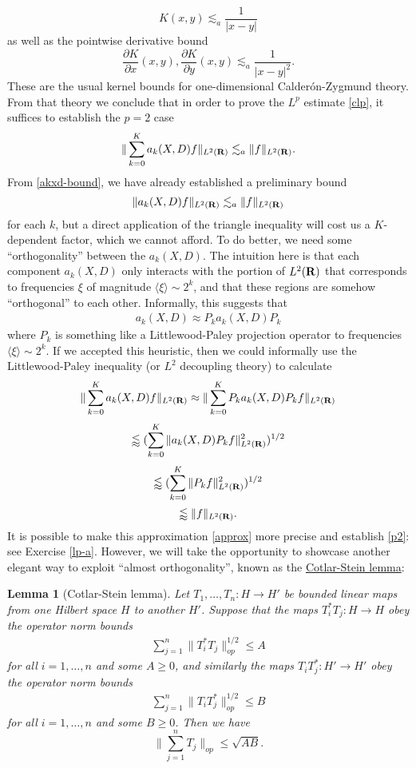 \documentclass[11pt]{article}
\newtheorem{lemma}[theorem]{Lemma}
\theoremstyle{definition}
\theoremstyle{remark}
\begin{document}
\[\displaystyle  K(x,y) \lesssim_a \frac{1}{|x-y|}\]
 as well as the pointwise derivative bound 
\[\displaystyle  \frac{\partial K}{\partial x}(x,y), \frac{\partial K}{\partial y}(x,y) \lesssim_{a} \frac{1}{|x-y|^2}.\]
 These are the usual kernel bounds for one-dimensional Calderón-Zygmund theory. From that theory we conclude that in order to prove the \({L^p}\) estimate \eqref{clp}, it suffices to establish the \({p=2}\) case 
\begin{align}\label{p2}
  \| \sum_{k=0}^K a_k(X,D) f\|_{L^2({\bf R})} \lesssim_{a} \|f\|_{L^2({\bf R})}. 
\end{align}
 From \eqref{akxd-bound}, we have already established a preliminary bound 
\[\displaystyle  \| a_k(X,D) f\|_{L^2({\bf R})} \lesssim_{a} \|f\|_{L^2({\bf R})}\]
 for each \({k}\), but a direct application of the triangle inequality will cost us a \({K}\)-dependent factor, which we cannot afford. To do better, we need some “orthogonality” between the \({a_k(X,D)}\). The intuition here is that each component \({a_k(X,D)}\) only interacts with the portion of \({L^2({\bf R})}\) that corresponds to frequencies \({\xi}\) of magnitude \({\langle \xi \rangle \sim 2^k}\), and that these regions are somehow “orthogonal” to each other. Informally, this suggests that 
\begin{align}\label{approx}
  a_k(X,D) \approx P_k a_k(X,D) P_k 
\end{align}
 where \({P_k}\) is something like a Littlewood-Paley projection operator to frequencies \({\langle \xi \rangle \sim 2^k}\). If we accepted this heuristic, then we could informally use the Littlewood-Paley inequality (or \({L^2}\) decoupling theory) to calculate 
\[\displaystyle  \| \sum_{k=0}^K a_k(X,D) f \|_{L^2({\bf R})} \approx \| \sum_{k=0}^K P_k a_k(X,D) P_k f \|_{L^2({\bf R})} \]
\[\displaystyle  \lessapprox (\sum_{k=0}^K \| a_k(X,D) P_k f \|_{L^2({\bf R})}^2)^{1/2}\]
\[\displaystyle  \lessapprox (\sum_{k=0}^K \| P_k f \|_{L^2({\bf R})}^2)^{1/2}\]
\[\displaystyle  \lessapprox \|f\|_{L^2({\bf R})}.\]
 It is possible to make this approximation \eqref{approx} more precise and establish \eqref{p2}: see Exercise \ref{lp-a}. However, we will take the opportunity to showcase another elegant way to exploit “almost orthogonality”, known as the \href{https://en.wikipedia.org/wiki/Cotlar%E2%80%93Stein_lemma}{Cotlar-Stein lemma}:
\begin{lemma}[Cotlar-Stein lemma]
  Let \({T_1,\dots,T_n: H \rightarrow H'}\) be bounded linear maps from one Hilbert space \({H}\) to another \({H'}\). Suppose that the maps \({T_i^* T_j: H \rightarrow H}\) obey the operator norm bounds 
\begin{align}\label{hi}
  \sum_{j=1}^n \|T_i^* T_j\|_{op}^{1/2} \leq A 
\end{align}
 for all \({i=1,\dots,n}\) and some \({A \geq 0}\), and similarly the maps \({T_i T_j^*: H' \rightarrow H'}\) obey the operator norm bounds 
\begin{align}\label{lo}
  \sum_{j=1}^n \|T_i T_j^*\|_{op}^{1/2} \leq B 
\end{align}
 for all \({i=1,\dots,n}\) and some \({B \geq 0}\). Then we have 
\[\displaystyle  \| \sum_{j=1}^n T_j \|_{op} \leq \sqrt{AB}.\]

\end{lemma}
\end{document}
